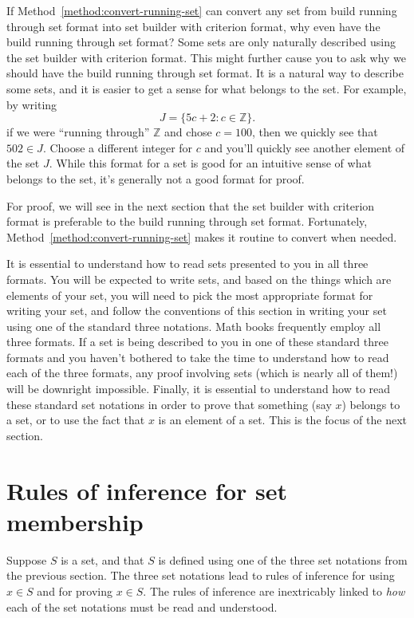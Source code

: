 \documentclass{book}
\theoremstyle{ekimcustom}
\begin{document}
If Method~\ref{method:convert-running-set} can convert any set from build running through set format into set builder with criterion format, why even have the build running through set format? Some sets are only naturally described using the set builder with criterion format. This might further cause you to ask why we should have the build running through set format. It is a natural way to describe some sets, and it is easier to get a sense for what belongs to the set. For example, by writing 
\[ J = \{5c+2 : c \in \mathbb{Z}\}.\]
if we were ``running through'' $\mathbb{Z}$ and chose $c=100$, then we quickly see that $502 \in J$. Choose a different integer for $c$ and you'll quickly see another element of the set $J$. While this format for a set is good for an intuitive sense of what belongs to the set, it's generally not a good format for proof.

For proof, we will see in the next section that the set builder with criterion format is preferable to the build running through set format. Fortunately, Method~\ref{method:convert-running-set} makes it routine to convert when needed.

It is essential to understand how to read sets presented to you in all three formats. You will be expected to write sets, and based on the things which are elements of your set, you will need to pick the most appropriate format for writing your set, and follow the conventions of this section in writing your set using one of the standard three notations. Math books frequently employ all three formats. If a set is being described to you in one of these standard three formats and you haven't bothered to take the time to understand how to read each of the three formats, any proof involving sets (which is nearly all of them!) will be downright impossible. Finally, it is essential to understand how to read these standard set notations in order to prove that something (say $x$) belongs to a set, or to use the fact that $x$ is an element of a set. This is the focus of the next section.

\section{Rules of inference for set membership}

Suppose $S$ is a set, and that $S$ is defined using one of the three set notations from the previous section. The three set notations lead to rules of inference for using $x \in S$ and for proving $x \in S$. The rules of inference are inextricably linked to \emph{how} each of the set notations must be read and understood.
\end{document}
